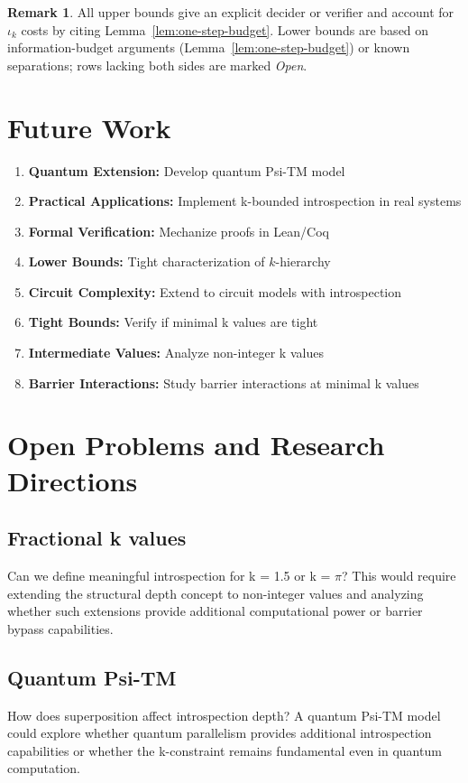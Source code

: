 \documentclass[11pt]{article}
\theoremstyle{plain}
\theoremstyle{definition}
\newtheorem{remark}[theorem]{Remark}
\begin{document}
\begin{remark}
All upper bounds give an explicit decider or verifier and account for $\iota_k$ costs by citing Lemma~\ref{lem:one-step-budget}. Lower bounds are based on information-budget arguments (Lemma~\ref{lem:one-step-budget}) or known separations; rows lacking both sides are marked \emph{Open}.
\end{remark}

\section{Future Work}

\begin{enumerate}
\item \textbf{Quantum Extension:} Develop quantum Psi-TM model
\item \textbf{Practical Applications:} Implement k-bounded introspection in real systems  
\item \textbf{Formal Verification:} Mechanize proofs in Lean/Coq
\item \textbf{Lower Bounds:} Tight characterization of $k$-hierarchy
\item \textbf{Circuit Complexity:} Extend to circuit models with introspection
\item \textbf{Tight Bounds:} Verify if minimal k values are tight
\item \textbf{Intermediate Values:} Analyze non-integer k values
\item \textbf{Barrier Interactions:} Study barrier interactions at minimal k values
\end{enumerate}

\section{Open Problems and Research Directions}

\subsection{Fractional k values}
Can we define meaningful introspection for k = 1.5 or k = $\pi$? This would require extending the structural depth concept to non-integer values and analyzing whether such extensions provide additional computational power or barrier bypass capabilities.

\subsection{Quantum Psi-TM}
How does superposition affect introspection depth? A quantum Psi-TM model could explore whether quantum parallelism provides additional introspection capabilities or whether the k-constraint remains fundamental even in quantum computation.
\end{document}
